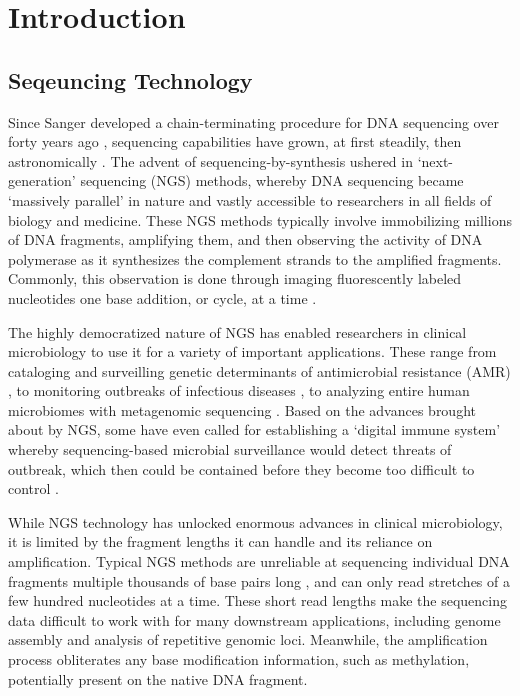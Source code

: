 \chapter{Introduction}
\label{chap:intro}

\section{Seqeuncing Technology}
\label{sec:seq}
Since Sanger developed a chain-terminating procedure for DNA sequencing over forty years ago \citep{Sanger1977-lo}, sequencing capabilities have grown, at first steadily, then astronomically \citep{Schatz2013-vw}. The advent of sequencing-by-synthesis ushered in ‘next-generation’ sequencing (NGS) methods, whereby DNA sequencing became ‘massively parallel’ in nature and vastly accessible to researchers in all fields of biology and medicine. These NGS methods typically involve immobilizing millions of DNA fragments, amplifying them, and then observing the activity of DNA polymerase as it synthesizes the complement strands to the amplified fragments. Commonly, this observation is done through imaging fluorescently labeled nucleotides one base addition, or cycle, at a time \citep{Shendure2017-oy}.

The highly democratized nature of NGS has enabled researchers in clinical microbiology to use it for a variety of important applications. These range from cataloging and surveilling genetic determinants of antimicrobial resistance (AMR) \citep{Crofts2017-ni, Canica2019-ho, Toth2020-ov, Thanner2016-wy, Hendriksen2019-qi}, to monitoring outbreaks of infectious diseases \citep{Dipaola2020-bw, Lu2020-ti}, to analyzing entire human microbiomes with metagenomic sequencing \citep{Chiu2019-cg}. Based on the advances brought about by NGS, some have even called for establishing a ‘digital immune system’ whereby sequencing-based microbial surveillance would detect threats of outbreak, which then could be contained before they become too difficult to control \citep{Schatz2012-ow}.

While NGS technology has unlocked enormous advances in clinical microbiology, it is limited by the fragment lengths it can handle and its reliance on amplification. Typical NGS methods are unreliable at sequencing individual DNA fragments multiple thousands of base pairs long \citep{Heather2016-wb}, and can only read stretches of a few hundred nucleotides at a time. These short read lengths make the sequencing data difficult to work with for many downstream applications, including genome assembly and analysis of repetitive genomic loci. Meanwhile, the amplification process obliterates any base modification information, such as methylation, potentially present on the native DNA fragment.

